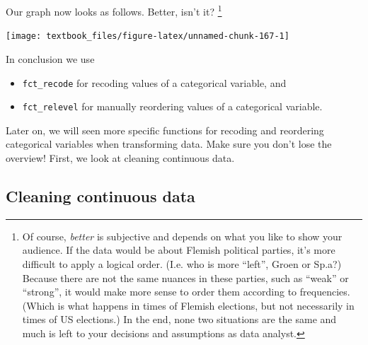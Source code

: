 \documentclass[]{tufte-book}
\newenvironment{Shaded}{}{}
\newcommand{\DataTypeTok}[1]{\textcolor[rgb]{0.56,0.13,0.00}{#1}}
\newcommand{\DecValTok}[1]{\textcolor[rgb]{0.25,0.63,0.44}{#1}}
\newcommand{\KeywordTok}[1]{\textcolor[rgb]{0.00,0.44,0.13}{\textbf{#1}}}
\newcommand{\NormalTok}[1]{#1}
\newcommand{\OperatorTok}[1]{\textcolor[rgb]{0.40,0.40,0.40}{#1}}
\newcommand{\StringTok}[1]{\textcolor[rgb]{0.25,0.44,0.63}{#1}}
\providecommand{\tightlist}{%
  \setlength{\itemsep}{0pt}\setlength{\parskip}{0pt}}
\begin{document}
Our graph now looks as follows. Better, isn't it? \footnote{Of course, \emph{better} is subjective and depends on what you like to show your audience. If the data would be about Flemish political parties, it's more difficult to apply a logical order. (I.e. who is more ``left'', Groen or Sp.a?) Because there are not the same nuances in these parties, such as ``weak'' or ``strong'', it would make more sense to order them according to frequencies. (Which is what happens in times of Flemish elections, but not necessarily in times of US elections.) In the end, none two situations are the same and much is left to your decisions and assumptions as data analyst.}

\begin{Shaded}
\end{Shaded}

\texttt{[image: textbook\_files/figure-latex/unnamed-chunk-167-1]}

In conclusion we use

\begin{itemize}
\tightlist
\item
  \texttt{fct\_recode} for recoding values of a categorical variable, and
\item
  \texttt{fct\_relevel} for manually reordering values of a categorical variable.
\end{itemize}

Later on, we will seen more specific functions for recoding and reordering categorical variables when transforming data. Make sure you don't lose the overview! First, we look at cleaning continuous data.

\hypertarget{cleaning-continuous-data}{%
\subsection{Cleaning continuous data}\label{cleaning-continuous-data}}
\end{document}
